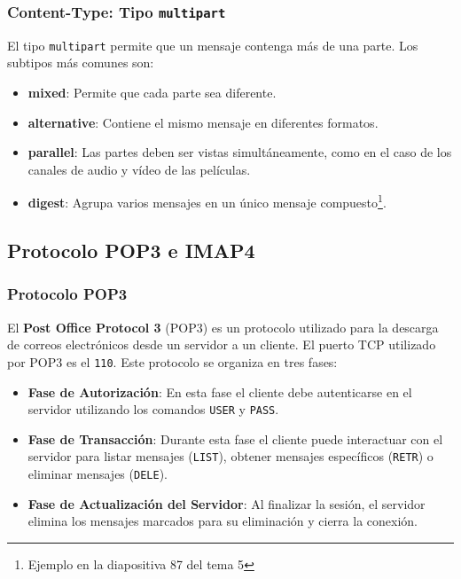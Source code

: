 \documentclass[a4paper,12pt]{article}
\begin{document}
\subsubsection{Content-Type: Tipo \texttt{multipart}}
El tipo \texttt{multipart} permite que un mensaje contenga más de una parte. Los subtipos más comunes son:

\begin{itemize}
    \item \textbf{mixed}: Permite que cada parte sea diferente.
    \item \textbf{alternative}: Contiene el mismo mensaje en diferentes formatos.
    \item \textbf{parallel}: Las partes deben ser vistas simultáneamente, como en el caso de los canales de audio y vídeo de las películas.
    \item \textbf{digest}: Agrupa varios mensajes en un único mensaje compuesto\footnote{Ejemplo en la diapositiva 87 del tema 5}.
\end{itemize}

\subsection{Protocolo POP3 e IMAP4}

\subsubsection{Protocolo POP3}

El \textbf{Post Office Protocol 3} (POP3) es un protocolo utilizado para la descarga de correos electrónicos desde un servidor a un cliente. El puerto TCP utilizado por POP3 es el \texttt{110}. Este protocolo se organiza en tres fases: 

\begin{itemize}
    \item \textbf{Fase de Autorización}: En esta fase el cliente debe autenticarse en el servidor utilizando los comandos \texttt{USER} y \texttt{PASS}.
    \item \textbf{Fase de Transacción}: Durante esta fase el cliente puede interactuar con el servidor para listar mensajes (\texttt{LIST}), obtener mensajes específicos (\texttt{RETR}) o eliminar mensajes (\texttt{DELE}).
    \item \textbf{Fase de Actualización del Servidor}: Al finalizar la sesión, el servidor elimina los mensajes marcados para su eliminación y cierra la conexión.
\end{itemize}
\end{document}
